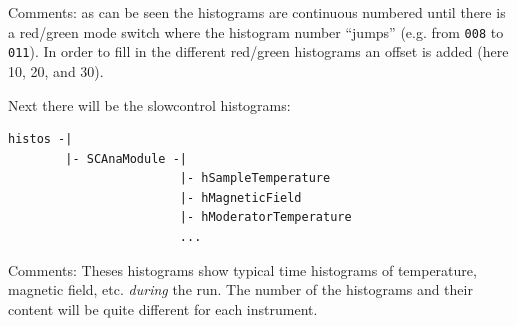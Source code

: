\documentclass[twoside]{article}
\newcommand{\redgreen}{\color{red}red\color{black}/\color{green}green\color{black}\xspace}
\begin{document}
\noindent Comments: as can be seen the histograms are continuous numbered until there is a \redgreen mode switch where the histogram number ``jumps'' (e.g. from \verb!008! to \verb!011!). In order to fill in the different \redgreen histograms an offset is added (here 10, 20, and 30).

Next there will be the slowcontrol histograms:
\begin{small}
\begin{verbatim}
histos -|
        |- SCAnaModule -|
                        |- hSampleTemperature
                        |- hMagneticField
                        |- hModeratorTemperature
                        ...
\end{verbatim}
\end{small}
\noindent Comments: Theses histograms show typical time histograms of temperature, magnetic field, etc. \emph{during} the run. The number of the histograms and their content will be quite different for each instrument.
\end{document}
